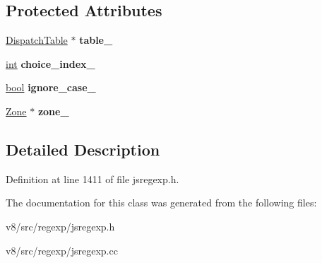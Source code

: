 \subsection*{Protected Attributes}
\begin{DoxyCompactItemize}
\item 
\mbox{\label{classv8_1_1internal_1_1DispatchTableConstructor_ac24136ab00d4fba0fc0077970832842d}} 
\mbox{\hyperlink{classv8_1_1internal_1_1DispatchTable}{Dispatch\+Table}} $\ast$ {\bfseries table\+\_\+}
\item 
\mbox{\label{classv8_1_1internal_1_1DispatchTableConstructor_a5e4b4a8a541c0d4743049ad864812ec2}} 
\mbox{\hyperlink{classint}{int}} {\bfseries choice\+\_\+index\+\_\+}
\item 
\mbox{\label{classv8_1_1internal_1_1DispatchTableConstructor_a5d2858b027b6417237daaaff21070656}} 
\mbox{\hyperlink{classbool}{bool}} {\bfseries ignore\+\_\+case\+\_\+}
\item 
\mbox{\label{classv8_1_1internal_1_1DispatchTableConstructor_aa66c09c6c54e03b653d344c2c172c396}} 
\mbox{\hyperlink{classv8_1_1internal_1_1Zone}{Zone}} $\ast$ {\bfseries zone\+\_\+}
\end{DoxyCompactItemize}


\subsection{Detailed Description}


Definition at line 1411 of file jsregexp.\+h.



The documentation for this class was generated from the following files\+:\begin{DoxyCompactItemize}
\item 
v8/src/regexp/jsregexp.\+h\item 
v8/src/regexp/jsregexp.\+cc\end{DoxyCompactItemize}
